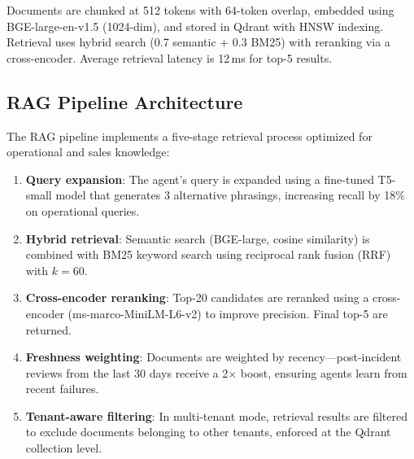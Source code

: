 \documentclass[conference,10pt,letterpaper]{IEEEtran}
\begin{document}
\begin{table}[!t]
\caption{RAG Knowledge Base Contents}
\label{tab:rag}
\centering\scriptsize
{}
\end{table}

Documents are chunked at 512 tokens with 64-token overlap, embedded using BGE-large-en-v1.5 (1024-dim), and stored in Qdrant with HNSW indexing. Retrieval uses hybrid search (0.7 semantic + 0.3 BM25) with reranking via a cross-encoder. Average retrieval latency is 12\,ms for top-5 results.


\subsection{RAG Pipeline Architecture}

The RAG pipeline implements a five-stage retrieval process optimized for operational and sales knowledge:

\begin{enumerate}
\item \textbf{Query expansion}: The agent's query is expanded using a fine-tuned T5-small model that generates 3 alternative phrasings, increasing recall by 18\% on operational queries.
\item \textbf{Hybrid retrieval}: Semantic search (BGE-large, cosine similarity) is combined with BM25 keyword search using reciprocal rank fusion (RRF) with $k{=}60$.
\item \textbf{Cross-encoder reranking}: Top-20 candidates are reranked using a cross-encoder (ms-marco-MiniLM-L6-v2) to improve precision. Final top-5 are returned.
\item \textbf{Freshness weighting}: Documents are weighted by recency---post-incident reviews from the last 30 days receive a 2$\times$ boost, ensuring agents learn from recent failures.
\item \textbf{Tenant-aware filtering}: In multi-tenant mode, retrieval results are filtered to exclude documents belonging to other tenants, enforced at the Qdrant collection level.
\end{enumerate}
\end{document}
